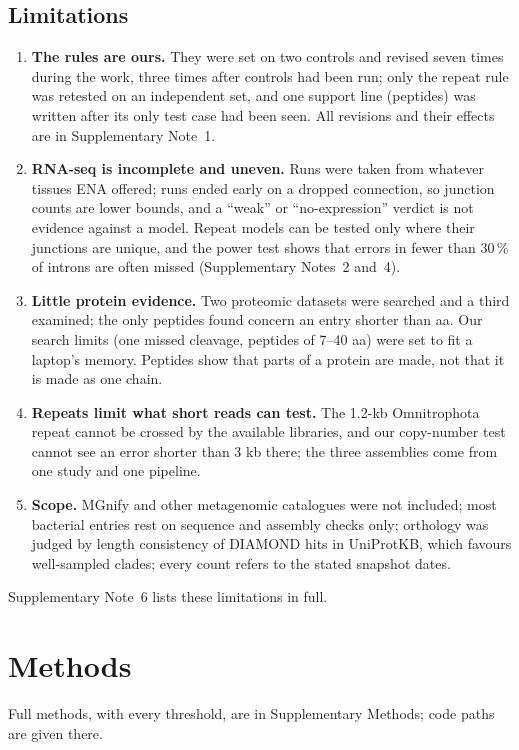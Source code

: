 \documentclass[11pt]{article}
\begin{document}
\subsection*{Limitations}
\begin{enumerate}[leftmargin=*]
\item \textbf{The rules are ours.} They were set on two controls and revised seven times during the work, three times
after controls had been run; only the repeat rule was retested on an independent set, and one support line (peptides) was
written after its only test case had been seen. All revisions and their effects are in Supplementary Note~1.
\item \textbf{RNA-seq is incomplete and uneven.} Runs were taken from whatever tissues ENA offered; 
runs ended early on a dropped connection, so junction counts are lower bounds, and a ``weak'' or ``no-expression''
verdict is not evidence against a model. Repeat models can be tested only where their junctions are unique, and the
power test shows that errors in fewer than 30\,\% of introns are often missed (Supplementary Notes~2 and~4).
\item \textbf{Little protein evidence.} Two proteomic datasets were searched and a third examined; the only peptides
found concern an entry shorter than  aa. Our search limits (one missed cleavage, peptides of 7--40 aa) were set to fit a
laptop's memory. Peptides show that parts of a protein are made, not that it is made as one chain.
\item \textbf{Repeats limit what short reads can test.} The 1.2-kb Omnitrophota repeat cannot be crossed by the
available libraries, and our copy-number test cannot see an error shorter than 3 kb there; the three assemblies come from
one study and one pipeline.
\item \textbf{Scope.} MGnify and other metagenomic catalogues were not included; most bacterial entries rest on sequence
and assembly checks only; orthology was judged by length consistency of DIAMOND hits in UniProtKB, which favours
well-sampled clades; every count refers to the stated snapshot dates.
\end{enumerate}
Supplementary Note~6 lists these limitations in full.

\section{Methods}

Full methods, with every threshold, are in Supplementary Methods; code paths are given there.
\end{document}
